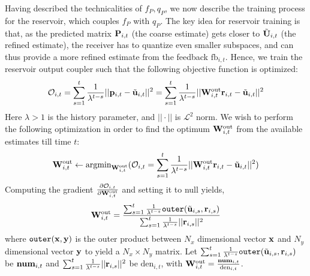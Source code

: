 \documentclass[conference]{IEEEtran}
\begin{document}
{%
\noindent Having described the technicalities of $f_P,q_P$, we now describe the training process for the reservoir, which couples $f_P$ with $q_P$. The key idea for reservoir training is that, as the predicted matrix ${\bf P}_{i,t}$ (the coarse estimate) gets closer to $\tilde{{\bf U}}_{i,t}$ (the refined estimate), the receiver has to quantize even smaller subspaces, and can thus provide a more refined estimate from the feedback $\text{fb}_{i,t}$.
Hence, we train the reservoir output coupler such that the following objective function is optimized:
\begin{equation}
\mathcal{O}_{i,t}=\sum_{s=1}^{t}\frac{1}{\lambda^{t-s}}||\bp_{i,t}-\tilde{\bu}_{i,t}||^2=\sum_{s=1}^{t}\frac{1}{\lambda^{t-s}}||\bW_{i,t}^{\text{out}}\br_{i,t}-\tilde{\bu}_{i,t}||^2
\label{oit}
\end{equation}
Here $\lambda>1$ is the history parameter, and $||\cdot||$ is $\mathcal{L}^2$ norm.
We wish to perform the following optimization in order to find the optimum ${\bf W}_{i,t}^{\text{out}}$ from the available estimates till time $t$:
\begin{equation}
\bW_{i,t}^{\text{out}}\gets\text{argmin}_{\bW_{i,t}^{\text{out}}}(\mathcal{O}_{i,t}=\sum_{s=1}^{t}\frac{1}{\lambda^{t-s}}||\bW_{i,t}^{\text{out}}\br_{i,t}-\tilde{\bu}_{i,t}||^2)
\label{getsOpt}
\end{equation}
Computing the gradient $\frac{\partial \mathcal{O}_{i,t}}{\partial {\bf W}_{i,t}^{\text{out}}}$ and setting it to null yields,
\begin{equation}
\bW_{i,t}^{\text{out}}=\frac{\sum_{s=1}^{t}\frac{1}{\lambda^{t-s}}\texttt{outer}(\tilde{\bu}_{i,s},\br_{i,s})}{\sum_{s=1}^{t}\frac{1}{\lambda^{t-s}}||\br_{i,s}||^2}
\label{backpass}
\end{equation}
where $\texttt{outer}({\bf x},{\bf y})$ is the outer product between $N_x$ dimensional vector ${\bf x}$ and $N_y$ dimensional vector ${\bf y}$ to yield a $N_x\times N_y$ matrix.
Let $\sum_{s=1}^{t}\frac{1}{\lambda^{t-s}}\texttt{outer}(\tilde{{\bf u}}_{i,s},{\bf r}_{i,s})$ be $\text{\textbf{num}}_{i,t}$ and $\sum_{s=1}^{t}\frac{1}{\lambda^{t-s}}||{\bf r}_{i,s}||^2$ be $\text{den}_{i,t}$, with ${\bf W}_{i,t}^{\text{out}}=\frac{\text{\textbf{num}}_{i,t}}{\text{den}_{i,t}}$.
}
\end{document}
